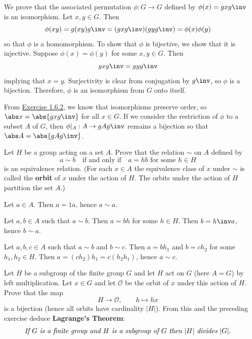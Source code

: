 \begin{sol}
    We prove that the associated permutation $\phi : G \to G$ defined by $\phi(x) = gxg\inv$ is an isomorphism. Let $x, y \in G$. Then
    \[\phi(xy) = g(xy)g\inv = (gxg\inv)(gyg\inv) = \phi(x)\phi(y)\]
    so that $\phi$ is a homomorphism. To show that $\phi$ is bijective, we show that it is injective. Suppose $\phi(x) = \phi(y)$ for some $x, y \in G$. Then
    \[gxg\inv = gyg\inv\]
    implying that $x = y$. Surjectivity is clear from conjugation by $g\inv$, so $\phi$ is a bijection. Therefore, $\phi$ is an isomorphism from $G$ onto itself.

    From \hyperref[ex1.6.2]{Exercise 1.6.2}, we know that isomorphisms preserve order, so $\abs x = \abs{gxg\inv}$ for all $x \in G$. If we consider the restriction of $\phi$ to a subset $A$ of $G$, then $\phi|_A : A \to gAg\inv$ remains a bijection so that $\abs A = \abs{gAg\inv}$.
\end{sol}

\begin{specialexercise} \label{ex1.7.18}
    Let $H$ be a group acting on a set $A$. Prove that the relation $\sim$ on $A$ defined by  
    \[a \sim b \quad \text{if and only if} \quad a = hb \text{ for some } h \in H\]
    is an equivalence relation. (For each $x\in A$ the equivalence class of $x$ under $\sim$ is called the \textbf{orbit} of $x$ under the action of $H$. The orbits under the action of $H$ partition the set $A$.)
\end{specialexercise}

\begin{solitem}
    \item Let $a \in A$. Then $a = 1a$, hence $a \sim a$.
    \item Let $a, b \in A$ such that $a \sim b$. Then $a = bh$ for some $h \in H$. Then $b = h\inv a$, hence $b \sim a$.
    \item Let $a, b, c \in A$ such that $a \sim b$ and $b \sim c$. Then $a = bh_1$ and $b = ch_2$ for some $h_1, h_2 \in H$. Then $a = (ch_2)h_1 = c(h_2h_1)$, hence $a \sim c$.
\end{solitem}

\begin{specialexercise} \label{ex1.7.19}
    Let $H$ be a subgroup of the finite group $G$ and let $H$ act on $G$ (here $A = G$) by left multiplication. Let $x\in G$ and let $\mathcal{O}$ be the orbit of $x$ under this action of $H$. Prove that the map  
    \[
    H \to \mathcal{O}, \qquad h \mapsto hx
    \]
    is a bijection (hence all orbits have cardinality $|H|$). From this and the preceding exercise deduce \textbf{Lagrange's Theorem}:  
    \[\emph{If $G$ is a finite group and $H$ is a subgroup of $G$ then $|H|$ divides $|G|$}.\]
\end{specialexercise}


